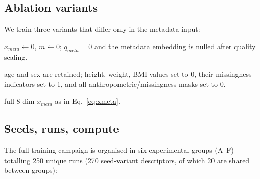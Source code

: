 \documentclass[mathematics,article,submit,pdftex]{Definitions/mdpi}
\def\texttt#1{#1}%
\def\mathrm#1{#1}%
\def\mathbf#1{#1}%
\def\textbf#1{#1}%
\def\emph#1{#1}%
\begin{document}
\subsection{Ablation variants}
We train three variants that differ \emph{only} in the metadata input:
\begin{description}[leftmargin=1.5em, style=sameline, font=\normalfont]
\item[\texttt{none}] $\mathbf{x}_{\mathrm{meta}}{\leftarrow}\mathbf{0}$, $\mathbf{m}{\leftarrow}\mathbf{0}$; $q_{\mathrm{meta}}{=}0$ and the metadata embedding is nulled after quality scaling.
\item[\texttt{demo}] age and sex are retained; height, weight, BMI values set to 0, their missingness indicators set to 1, and all anthropometric/missingness masks set to 0.
\item[\texttt{demo+anthro}] full 8-dim $\mathbf{x}_{\mathrm{meta}}$ as in Eq.~\eqref{eq:xmeta}.
\end{description}

\subsection{Seeds, runs, compute}
The full training campaign is organised in \textbf{six experimental groups (A--F)} totalling \textbf{250 unique runs} (270 seed-variant descriptors, of which 20 are shared between groups):
\end{document}
